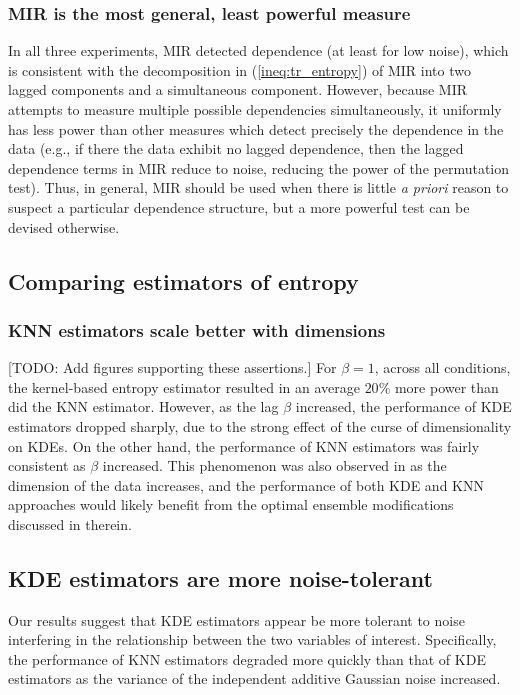 \documentclass{article} %
\begin{document}
\subsubsection{MIR is the most general, least powerful measure}
In all three experiments, MIR detected dependence (at least for low noise),
which is consistent with the decomposition in (\ref{ineq:tr_entropy}) of MIR
into two lagged components and a simultaneous component. However, because MIR
attempts to measure multiple possible dependencies simultaneously, it uniformly
has less power than other measures which detect precisely the dependence in the
data (e.g., if there the data exhibit no lagged dependence, then the lagged
dependence terms in MIR reduce to noise, reducing the power of the permutation
test). Thus, in general, MIR should be used when there is little
\emph{a priori} reason to suspect a particular dependence structure, but a
more powerful test can be devised otherwise.

\subsection{Comparing estimators of entropy}

\subsubsection{KNN estimators scale better with dimensions}
[TODO: Add figures supporting these assertions.]
For $\beta = 1$, across all conditions, the kernel-based entropy estimator
resulted in an average $20\%$ more power than did the KNN estimator. However,
as the lag $\beta$ increased, the performance of KDE estimators dropped
sharply, due to the strong effect of the curse of dimensionality on KDEs. On
the other hand, the performance of KNN estimators was fairly consistent as
$\beta$ increased. This phenomenon was also observed in \cite{moon14ensemble}
as the dimension of the data increases, and the performance of both KDE and KNN
approaches would likely benefit from the optimal ensemble modifications
discussed in therein.

\subsection{KDE estimators are more noise-tolerant}
Our results suggest that KDE estimators appear be more tolerant to noise
interfering in the relationship between the two variables of interest.
Specifically, the performance of KNN estimators degraded more quickly than
that of KDE estimators as the variance of the independent additive Gaussian
noise increased.
\end{document}

